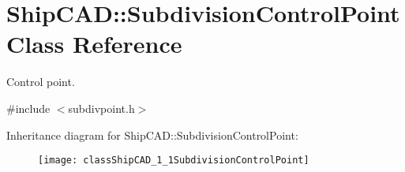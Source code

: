 \hypertarget{classShipCAD_1_1SubdivisionControlPoint}{}\section{Ship\+C\+AD\+:\+:Subdivision\+Control\+Point Class Reference}
\label{classShipCAD_1_1SubdivisionControlPoint}


Control point.  




{\ttfamily \#include $<$subdivpoint.\+h$>$}

Inheritance diagram for Ship\+C\+AD\+:\+:Subdivision\+Control\+Point\+:\begin{figure}[H]
\begin{center}
\leavevmode
\texttt{[image: classShipCAD\_1\_1SubdivisionControlPoint]}
\end{center}
\end{figure}

